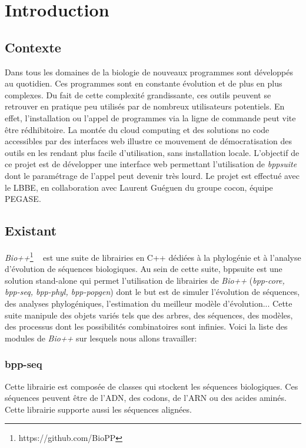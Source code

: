 \section{Introduction}

\subsection{Contexte}
	Dans tous les domaines de la biologie de nouveaux programmes sont développés au quotidien. Ces programmes sont en constante évolution et de plus en plus complexes. Du fait de cette complexité grandissante, ces outils peuvent se retrouver en pratique peu utilisés par de nombreux utilisateurs potentiels. En effet, l'installation ou l'appel de programmes via la ligne de commande peut vite être rédhibitoire.
	La montée du cloud computing et des solutions no code accessibles par des interfaces web illustre ce mouvement de démocratisation des outils en les rendant plus facile d'utilisation, sans installation locale.
	L'objectif de ce projet est de développer une interface web permettant l'utilisation de \textit{bppsuite} dont le paramétrage de l'appel peut devenir très lourd.
	Le projet est effectué avec le LBBE, en collaboration avec Laurent Guéguen du groupe cocon, équipe PEGASE.
	
	
\subsection{Existant}
	\textit{Bio++}\footnote{https://github.com/BioPP} ~\cite{Guéguen} est une suite de librairies en C++ dédiées à la phylogénie et à l'analyse d'évolution de séquences biologiques. Au sein de cette suite, bppsuite est une solution stand-alone qui permet l'utilisation de librairies de \textit{Bio++} (\textit{bpp-core, bpp-seq, bpp-phyl, bpp-popgen}) dont le but est de simuler l'évolution de séquences, des analyses phylogéniques, l'estimation du meilleur modèle d'évolution... Cette suite manipule des objets variés tels que des arbres, des séquences, des modèles, des processus dont les possibilités combinatoires sont infinies. Voici la liste des modules de \textit{Bio++} sur lesquels nous allons travailler:
	
	\subsubsection*{bpp-seq}
	Cette librairie est composée de classes qui stockent les séquences biologiques. Ces séquences peuvent être de l'ADN, des codons, de l'ARN ou des acides aminés. Cette librairie supporte aussi les séquences alignées.
	
